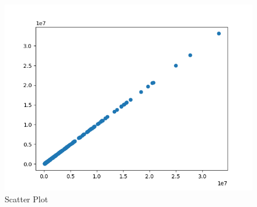 \begin{answer}
	\begin{figure}[h]
		\centering
		\includegraphics[width=0.7\linewidth]{03-poisson/assets/scatter-plot}
		\caption{Scatter Plot}
		\label{fig:scatter-plot}
	\end{figure}
\end{answer}
